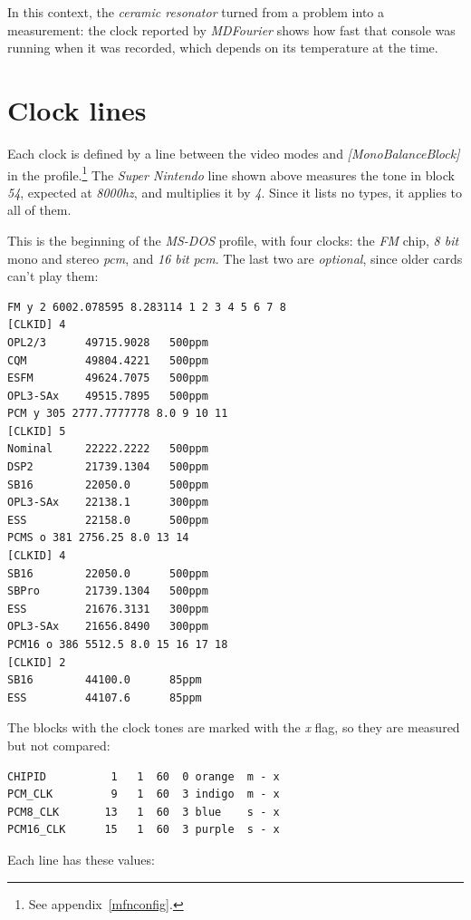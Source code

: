 \documentclass[10pt,a4paper]{report}
\newcommand{\ac}[1]{\textit{\mbox{\acrshort{#1}}}}
\newcommand{\hz}[1]{\textit{\mbox{#1\acrshort{hz}}}}
\begin{document}
\begin{appendices}
In this context, the \textit{ceramic resonator} turned from a problem into a measurement: the clock reported by \textit{MDFourier} shows how fast that console was running when it was recorded, which depends on its temperature at the time.

\section{Clock lines}

Each clock is defined by a line between the video modes and \textit{[MonoBalanceBlock]} in the profile.\footnote{See appendix~\ref{mfnconfig}.} The \textit{Super Nintendo} line shown above measures the tone in block \textit{54}, expected at \hz{8000}, and multiplies it by \textit{4}. Since it lists no types, it applies to all of them.

This is the beginning of the \textit{MS-DOS} profile, with four clocks: the \textit{FM} chip, \textit{8 bit} mono and stereo \ac{pcm}, and \textit{16 bit} \ac{pcm}. The last two are \textit{optional}, since older cards can't play them:

\begin{verbatim}
FM y 2 6002.078595 8.283114 1 2 3 4 5 6 7 8
[CLKID] 4
OPL2/3      49715.9028   500ppm
CQM         49804.4221   500ppm
ESFM        49624.7075   500ppm
OPL3-SAx    49515.7895   500ppm
PCM y 305 2777.7777778 8.0 9 10 11
[CLKID] 5
Nominal     22222.2222   500ppm
DSP2        21739.1304   500ppm
SB16        22050.0      500ppm
OPL3-SAx    22138.1      300ppm
ESS         22158.0      500ppm
PCMS o 381 2756.25 8.0 13 14
[CLKID] 4
SB16        22050.0      500ppm
SBPro       21739.1304   500ppm
ESS         21676.3131   300ppm
OPL3-SAx    21656.8490   300ppm
PCM16 o 386 5512.5 8.0 15 16 17 18
[CLKID] 2
SB16        44100.0      85ppm
ESS         44107.6      85ppm
\end{verbatim}

The blocks with the clock tones are marked with the \textit{x} flag, so they are measured but not compared:

\begin{verbatim}
CHIPID          1   1  60  0 orange  m - x
PCM_CLK         9   1  60  3 indigo  m - x
PCM8_CLK       13   1  60  3 blue    s - x
PCM16_CLK      15   1  60  3 purple  s - x
\end{verbatim}

Each line has these values:


\end{appendices}
\end{document}
